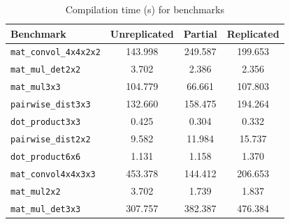 \begin{table}
\small
	\caption{Compilation time (s) for \system benchmarks}
	\label{tab:compilationtime}
	\vspace{-0.5em}
    \begin{tabular}{lccc}
        \toprule
        Benchmark & Unreplicated & Partial & Replicated\\\midrule
        \texttt{mat\_convol\_4x4x2x2} & 143.998 & 249.587 &199.653\\
        \texttt{mat\_mul\_det2x2} & 3.702 & 2.386 &2.356\\
        \texttt{mat\_mul3x3} &  104.779 & 66.661&107.803\\
        \texttt{pairwise\_dist3x3} & 132.660 & 158.475&194.264\\
        \texttt{dot\_product3x3} & 0.425 & 0.304&0.332\\
        \texttt{pairwise\_dist2x2} & 9.582 & 11.984&15.737\\
        \texttt{dot\_product6x6} & 1.131 & 1.158&1.370\\
        \texttt{mat\_convol4x4x3x3} & 453.378 & 144.412&206.653\\
        \texttt{mat\_mul2x2} & 3.702 & 1.739&1.837\\
        \texttt{mat\_mul\_det3x3} & 307.757 & 382.387&476.384\\
        \bottomrule
    \end{tabular}
\end{table}


